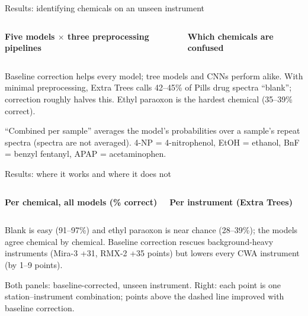 \documentclass[aspectratio=169,10pt]{beamer}
\newcommand{\takeaway}[1]{%
  \par\vspace{2pt}\noindent\colorbox{cTake}{\parbox{\dimexpr\textwidth-2\fboxsep\relax}{\small #1}}}
\newcommand{\src}[1]{{\par\vspace{1pt}\tiny\color{cInk2}#1\par}}
\begin{document}
\begin{frame}{Results: identifying chemicals on an unseen instrument}
\begin{columns}[T,onlytextwidth]
\centering
\scriptsize\textbf{Five models $\times$ three preprocessing pipelines}\par\smallskip

\centering
\scriptsize\textbf{Which chemicals are confused}\par\smallskip

\end{columns}
\takeaway{Baseline correction helps every model; tree models and CNNs perform alike. With minimal preprocessing, Extra Trees calls 42--45\% of Pills drug spectra ``blank''; correction roughly halves this. Ethyl paraoxon is the hardest chemical (35--39\% correct).}
\src{``Combined per sample'' averages the model's probabilities over a sample's repeat spectra (spectra are not averaged). 4-NP = 4-nitrophenol, EtOH = ethanol, BnF = benzyl fentanyl, APAP = acetaminophen.}
\end{frame}

\begin{frame}{Results: where it works and where it does not}
\begin{columns}[T,onlytextwidth]
\centering
\scriptsize\textbf{Per chemical, all models (\% correct)}\par\smallskip
\scalebox{1.13}{}
\centering
\scriptsize\textbf{Per instrument (Extra Trees)}\par\smallskip
\scalebox{1.08}{}
\end{columns}
\takeaway{Blank is easy (91--97\%) and ethyl paraoxon is near chance (28--39\%); the models agree chemical by chemical. Baseline correction rescues background-heavy instruments (Mira-3 +31, RMX-2 +35 points) but lowers every CWA instrument (by 1--9 points).}
\src{Both panels: baseline-corrected, unseen instrument. Right: each point is one station--instrument combination; points above the dashed line improved with baseline correction.}
\end{frame}
\end{document}
